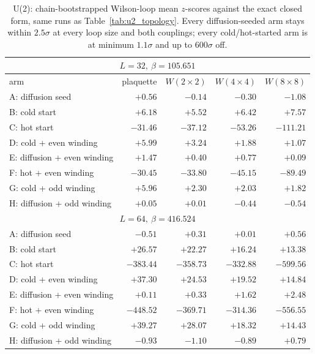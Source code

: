 \begin{table}[htbp]
\centering
\caption{U(2): chain-bootstrapped Wilson-loop mean $z$-scores against
the exact closed form, same runs as Table~\ref{tab:u2_topology}. Every
diffusion-seeded arm stays within $2.5\sigma$ at every loop size and both
couplings; every cold/hot-started arm is at minimum $1.1\sigma$ and up to
$600\sigma$ off.}
\label{tab:u2_observables}
\begin{tabular}{lrrrr}
\toprule
\multicolumn{5}{c}{$L=32,\ \beta=105.651$} \\
\midrule
arm & plaquette & $W(2\times2)$ & $W(4\times4)$ & $W(8\times8)$ \\
\midrule
A: diffusion seed              & $+0.56$   & $-0.14$   & $-0.30$   & $-1.08$   \\
B: cold start                  & $+6.18$   & $+5.52$   & $+6.42$   & $+7.57$   \\
C: hot start                   & $-31.46$  & $-37.12$  & $-53.26$  & $-111.21$ \\
D: cold + even winding         & $+5.99$   & $+3.24$   & $+1.88$   & $+1.07$   \\
E: diffusion + even winding    & $+1.47$   & $+0.40$   & $+0.77$   & $+0.09$   \\
F: hot + even winding          & $-30.45$  & $-33.80$  & $-45.15$  & $-89.49$  \\
G: cold + odd winding          & $+5.96$   & $+2.30$   & $+2.03$   & $+1.82$   \\
H: diffusion + odd winding     & $+0.05$   & $+0.01$   & $-0.44$   & $-0.54$   \\
\midrule
\multicolumn{5}{c}{$L=64,\ \beta=416.524$} \\
\midrule
A: diffusion seed              & $-0.51$   & $+0.31$   & $+0.01$   & $+0.56$   \\
B: cold start                  & $+26.57$  & $+22.27$  & $+16.24$  & $+13.38$  \\
C: hot start                   & $-383.44$ & $-358.73$ & $-332.88$ & $-599.56$ \\
D: cold + even winding         & $+37.30$  & $+24.53$  & $+19.52$  & $+14.84$  \\
E: diffusion + even winding    & $+0.11$   & $+0.33$   & $+1.62$   & $+2.48$   \\
F: hot + even winding          & $-448.52$ & $-369.71$ & $-314.36$ & $-556.55$ \\
G: cold + odd winding          & $+39.27$  & $+28.07$  & $+18.32$  & $+14.43$  \\
H: diffusion + odd winding     & $-0.93$   & $-1.10$   & $-0.89$   & $+0.79$   \\
\bottomrule
\end{tabular}
\end{table}

